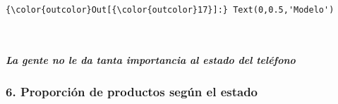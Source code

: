 \documentclass[11pt]{article}
\begin{document}
\begin{Verbatim}[commandchars=\\\{\}]
{\color{outcolor}Out[{\color{outcolor}17}]:} Text(0,0.5,'Modelo')
\end{Verbatim}
            
    \begin{center}
    \end{center}
    { \hspace*{\fill} \\}
    
    \hypertarget{la-gente-no-le-da-tanta-importancia-al-estado-del-teluxe9fono}{%
\subparagraph{La gente no le da tanta importancia al estado del
teléfono}\label{la-gente-no-le-da-tanta-importancia-al-estado-del-teluxe9fono}}

    \hypertarget{proporciuxf3n-de-productos-seguxfan-el-estado}{%
\subsubsection{6. Proporción de productos según el
estado}\label{proporciuxf3n-de-productos-seguxfan-el-estado}}
\end{document}
